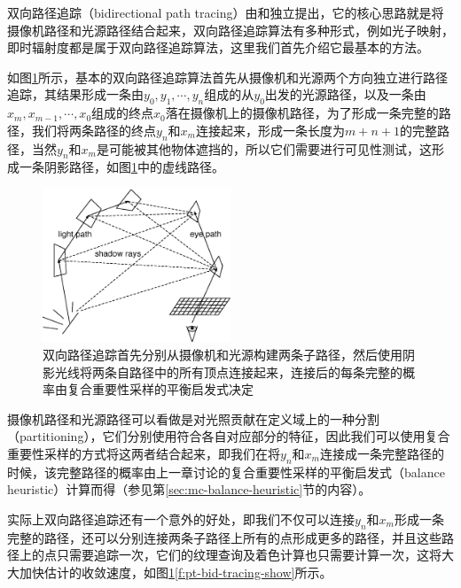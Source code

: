 双向路径追踪（bidirectional path tracing）由\cite{a:Bi-directionalpathtracing}和\cite{a:BidirectionalEstimatorsforLightTransport}独立提出，它的核心思路就是将摄像机路径和光源路径结合起来，双向路径追踪算法有多种形式，例如光子映射，即时辐射度都是属于双向路径追踪算法，这里我们首先介绍它最基本的方法。

如图\ref{f:pt-bidirectional}所示，基本的双向路径追踪算法首先从摄像机和光源两个方向独立进行路径追踪，其结果形成一条由$y_0,y_1,\cdots,y_n$组成的从$y_0$出发的光源路径，以及一条由$x_m,x_{m-1},\cdots,x_0$组成的终点$x_0$落在摄像机上的摄像机路径，为了形成一条完整的路径，我们将两条路径的终点$y_n$和$x_m$连接起来，形成一条长度为$m+n+1$的完整路径，当然$y_n$和$x_m$是可能被其他物体遮挡的，所以它们需要进行可见性测试，这形成一条阴影路径，如图\ref{f:pt-bidirectional}中的虚线路径。

\begin{figure}
	\sidecaption
	\includegraphics[width=0.5\textwidth]{figures/pt/bidirectional}
	\caption{双向路径追踪首先分别从摄像机和光源构建两条子路径，然后使用阴影光线将两条自路径中的所有顶点连接起来，连接后的每条完整的概率由复合重要性采样的平衡启发式决定}
	\label{f:pt-bidirectional}
\end{figure}

摄像机路径和光源路径可以看做是对光照贡献在定义域上的一种分割（partitioning），它们分别使用符合各自对应部分的特征，因此我们可以使用复合重要性采样的方式将这两者结合起来，即我们在将$y_n$和$x_m$连接成一条完整路径的时候，该完整路径的概率由上一章讨论的复合重要性采样的平衡启发式（balance heuristic）计算而得（参见第\ref{sec:mc-balance-heuristic}节的内容）。

实际上双向路径追踪还有一个意外的好处，即我们不仅可以连接$y_n$和$x_m$形成一条完整的路径，还可以分别连接两条子路径上所有的点形成更多的路径，并且这些路径上的点只需要追踪一次，它们的纹理查询及着色计算也只需要计算一次，这将大大加快估计的收敛速度，如图\ref{f:pt-bidirectional}\ref{f:pt-bid-tracing-show}所示。

